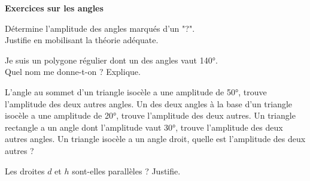 \documentclass[DIV=15,12pt, parskip=half-]{scrartcl}
\begin{document}
\begin{Huge}
    \bfseries
    Exercices sur les angles
\end{Huge}
\begin{exercise}
    Détermine l'amplitude des angles marqués d'un "?".\\
    Justifie en mobilisant la théorie adéquate.

        \autonum
        \hfil
        \autonum

        \autonum
        \hfil
        \autonum

        \autonum
        \hfil
        \autonum

        \autonum
        \hfil
        \autonum
\end{exercise}

\begin{exercise}
\end{exercise}

\begin{exercise}
    Je suis un polygone régulier dont un des angles vaut \ang{140}.\\
    Quel nom me donne-t-on ? Explique.
\end{exercise}

\begin{exercise}
    \begin{tasks}
        \task L'angle au sommet d'un triangle isocèle a
        une amplitude de \ang{50}, trouve l'amplitude des deux
        autres angles.
        \task Un des deux angles à la base d'un triangle isocèle a
        une amplitude de \ang{20}, trouve l'amplitude des deux
        autres.
        \task Un triangle rectangle a un angle dont l'amplitude
        vaut \ang{30}, trouve l'amplitude des deux autres angles.
        \task Un triangle isocèle a un angle droit, quelle est
        l'amplitude des deux autres ?
    \end{tasks}
\end{exercise}

\begin{exercise}
    Les droites $d$ et $h$ sont-elles parallèles ? Justifie.
\begin{tasks}
    \task 
    \task 
    \task 
    \task 
\end{tasks}
\end{exercise}
\end{document}
